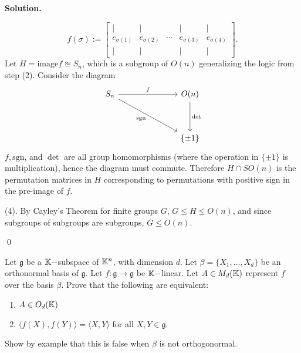 \documentclass[12pt]{book}
\theoremstyle{definition}
\newenvironment{solution}
{%
  \par\noindent\textbf{Solution.}\quad
}
{%
  \qed\par
}
\begin{document}
\begin{solution}
  \[f(\sigma) := 
  \begin{bmatrix}
  | & | &  & | & |\\
  e_{\sigma(1)} & e_{\sigma(2)} & \cdots & e_{\sigma(3)} & e_{\sigma(4)} \\
  | & | &  & | & |
  \end{bmatrix}.
  \]
  Let $H = \text{image} f \approxeq S_n$, which is a subgroup of $O(n)$ generalizing the logic from step (2).
  Consider the diagram
  \[\begin{tikzcd}
	{S_n} &&& {O(n)} \\
	\\
	&&& {\{\pm 1\}}
	\arrow["f", from=1-1, to=1-4]
	\arrow["{\text{sgn}}"', from=1-1, to=3-4]
	\arrow["\det", from=1-4, to=3-4]
\end{tikzcd}\]
  $f, \text{sgn}$, and $\det$ are all group homomorphisms (where the operation in $\{\pm 1\}$ is multiplication), hence the diagram must commute.
  Therefore $H \cap SO(n)$ is the permutation matrices in $H$ corresponding to permutations with positive sign in the pre-image of $f$.

  (4). By Cayley's Theorem for finite groups $G$, $G \leq H \leq O(n)$, and since subgroups of subgroups are subgroups, $G \leq O(n)$. 

\end{solution}


\begin{taggedexercise}[\textcolor{green}{Complete}]
Let $\mathfrak{g}$ be a $\mathbb{K}-$subspace of $\mathbb{K}^n$, with dimension $d$.
Let $\beta = \{X_1, \dots, X_d\}$ be an orthonormal basis of $\mathfrak{g}$.
Let $f: \mathfrak{g} \to \mathfrak{g}$ be $\mathbb{K}-$linear.
Let $A \in M_d(\mathbb{K})$ represent $f$ over the basis $\beta$.
Prove that the following are equivalent:
\begin{enumerate}
  \item $A \in O_d(\mathbb{K})$
  \item $\langle f(X), f(Y) \rangle = \langle X, Y \rangle$ for all $X, Y \in \mathfrak{g}$.
\end{enumerate}
Show by example that this is false when $\beta$ is not orthogonormal.
\end{taggedexercise}
\end{document}
